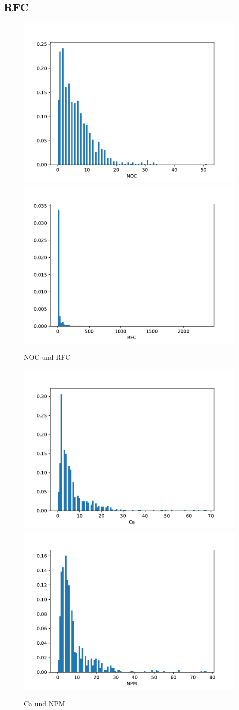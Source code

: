 \documentclass{scrreprt}
\begin{document}
\subsection{RFC}



\begin{figure}
 \includegraphics[width=.45\textwidth]{./NOC.pdf}
  \includegraphics[width=.45\textwidth]{./RFC.pdf}
 \caption{NOC und RFC}
 \label{abb:noc_rfc}
\end{figure}


\begin{figure}
 \includegraphics[width=.45\textwidth]{./Ca.pdf}
  \includegraphics[width=.45\textwidth]{./NPM.pdf}
 \caption{Ca und NPM}
 \label{abb:ca_npm}
\end{figure}
\end{document}
